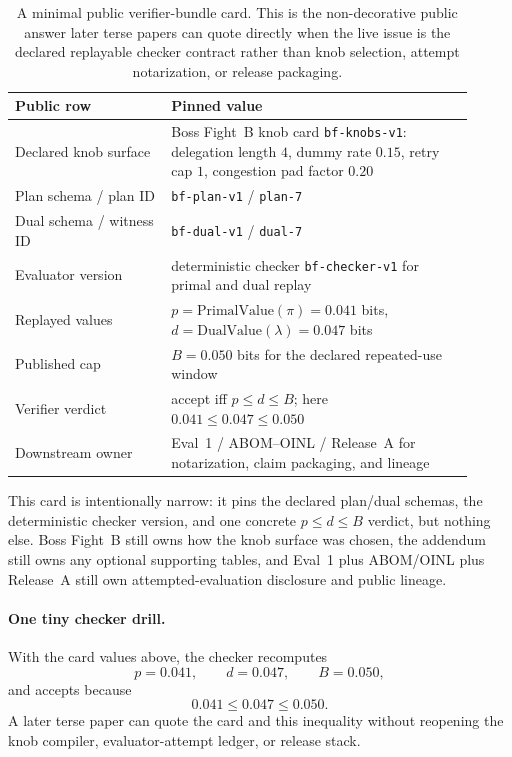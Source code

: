 \documentclass[11pt]{article}
\begin{document}
\begin{table}[t]
\centering
\small
\begin{tabular}{@{}p{0.31\linewidth}p{0.60\linewidth}@{}}
\toprule
\textbf{Public row} & \textbf{Pinned value}\\
\midrule
Declared knob surface & Boss Fight~B knob card \texttt{bf-knobs-v1}: delegation length $4$, dummy rate $0.15$, retry cap $1$, congestion pad factor $0.20$ \\
Plan schema / plan ID & \texttt{bf-plan-v1} / \texttt{plan-7} \\
Dual schema / witness ID & \texttt{bf-dual-v1} / \texttt{dual-7} \\
Evaluator version & deterministic checker \texttt{bf-checker-v1} for primal and dual replay \\
Replayed values & $p=\mathrm{PrimalValue}(\pi)=0.041$ bits, $d=\mathrm{DualValue}(\lambda)=0.047$ bits \\
Published cap & $B=0.050$ bits for the declared repeated-use window \\
Verifier verdict & accept iff $p\le d\le B$; here $0.041\le 0.047\le 0.050$ \\
Downstream owner & Eval~1 / ABOM--OINL / Release~A for notarization, claim packaging, and lineage \\
\bottomrule
\end{tabular}
\caption{A minimal public verifier-bundle card. This is the non-decorative public answer later terse papers can quote directly when the live issue is the declared replayable checker contract rather than knob selection, attempt notarization, or release packaging.}
\label{tab:minimal-verifier-card}
\end{table}

This card is intentionally narrow: it pins the declared plan/dual schemas, the deterministic checker version, and one concrete $p\le d\le B$ verdict, but nothing else.
Boss Fight~B still owns how the knob surface was chosen, the addendum still owns any optional supporting tables, and Eval~1 plus ABOM/OINL plus Release~A still own attempted-evaluation disclosure and public lineage.\cite{series:bossfightb,series:bossfightBaddendum,series:evalnotary,series:abomoinl,series:releaseproperty}

\paragraph{One tiny checker drill.}
With the card values above, the checker recomputes
\[
p=0.041,\qquad d=0.047,\qquad B=0.050,
\]
and accepts because
\[
0.041\le 0.047\le 0.050.
\]
A later terse paper can quote the card and this inequality without reopening the knob compiler, evaluator-attempt ledger, or release stack.
\end{document}

